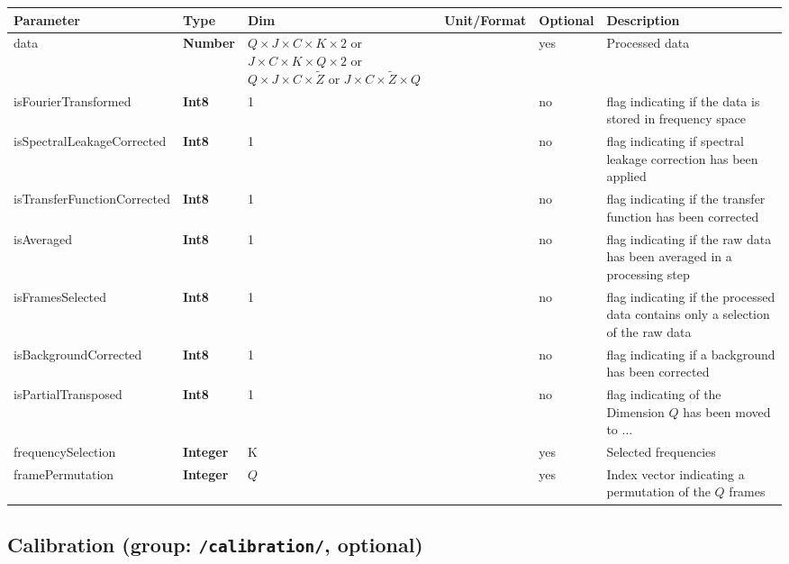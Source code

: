 \documentclass[landscape,a4paper]{article} %
\newcommand{\inl}[1]{\lstinline[columns=fixed]{#1}}
\newcommand{\inltab}[1]{{\ttfamily\bfseries\color{blue}#1}}
\newcommand{\inlvar}[1]{{\ttfamily#1}}
\begin{document}
\noindent \begin{tabularx}{\columnwidth}{llp{3cm}llX} 
\textbf{Parameter} & \textbf{Type} & \textbf{Dim} & \textbf{Unit/Format} & \textbf{Optional} & \textbf{Description} \\ \hline 
\inlvar{data} & \inltab{Number} & $Q \times J \times C \times K\times 2$ or $ J \times C \times K\times Q \times 2$ or $Q \times J \times C \times \tilde{Z}$ or $ J \times C \times \tilde{Z} \times Q$ & & yes & Processed data \\ \hline 
\inlvar{isFourierTransformed} & \inltab{Int8} & 1 & & no & flag indicating if the data is stored in frequency space \\ \hline
\inlvar{isSpectralLeakageCorrected} & \inltab{Int8} & 1 & & no & flag indicating if spectral leakage correction has been applied \\ \hline
\inlvar{isTransferFunctionCorrected} & \inltab{Int8} & 1 & & no & flag indicating if the transfer function has been corrected \\ \hline 
\inlvar{isAveraged} & \inltab{Int8} & 1 & & no & flag indicating if the raw data has been averaged in a processing step \\ \hline 
\inlvar{isFramesSelected} & \inltab{Int8} & 1 & & no & flag indicating if the processed data contains only a selection of the raw data \\ \hline
\inlvar{isBackgroundCorrected} & \inltab{Int8} & 1 & & no & flag indicating if a background has been corrected \\ \hline
\inlvar{isPartialTransposed} & \inltab{Int8} & 1 & & no & flag indicating of the Dimension $Q$ has been moved to ...\\ \hline
\inlvar{frequencySelection} & \inltab{Integer} & K & & yes & Selected frequencies \\ \hline
\inlvar{framePermutation} & \inltab{Integer} & $Q$ & & yes & Index vector indicating a permutation of the $Q$ frames\\ \hline 

\end{tabularx} 

\subsection{Calibration (group: \inl{/calibration/}, optional)}
\end{document}
